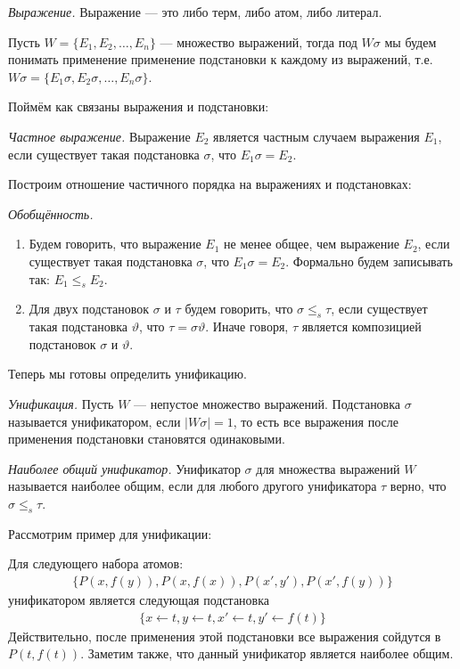\begin{definition}
  \emph{Выражение.} Выражение --- это либо терм, либо атом, либо литерал.
\end{definition}

Пусть $W = \{E_1, E_2, \ldots, E_n\}$ --- множество выражений, тогда под $W\sigma$ мы будем понимать применение применение подстановки к каждому из выражений, т.е. $W\sigma = \{E_1\sigma, E_2\sigma, \ldots, E_n\sigma\}$.

Поймём как связаны выражения и подстановки:
\begin{definition}
\emph{Частное выражение.} Выражение $E_2$ является частным случаем выражения $E_1$, если существует такая подстановка $\sigma$, что $E_1\sigma = E_2$.
\end{definition}

Построим отношение частичного порядка на выражениях и подстановках:
\begin{definition}
\emph{Обобщённость.}
  \begin{enumerate}
	\item Будем говорить, что выражение $E_1$ не менее общее, чем выражение $E_2$, если существует такая подстановка $\sigma$, что $E_1\sigma = E_2$. Формально будем записывать так: $E_1 \leq_s E_2$.
    \item Для двух подстановок $\sigma$ и $\tau$ будем говорить, что $\sigma \leq_s \tau$, если существует такая подстановка $\vartheta$, что $\tau = \sigma\vartheta$. Иначе говоря, $\tau$ является композицией подстановок $\sigma$ и $\vartheta$.
  \end{enumerate}
\end{definition}

Теперь мы готовы определить унификацию.

\begin{definition}
\emph{Унификация.} Пусть $W$ --- непустое множество выражений. Подстановка $\sigma$ называется унификатором, если $|W\sigma| = 1$, то есть все выражения после применения подстановки становятся одинаковыми.
\end{definition}

\begin{definition}
\emph{Наиболее общий унификатор.} Унификатор $\sigma$ для множества выражений $W$ называется наиболее общим, если для любого другого унификатора $\tau$ верно, что $\sigma \leq_s \tau$.
\end{definition}

Рассмотрим пример для унификации:
\begin{example}
Для следующего набора атомов:
\begin{gather*}
\{ P(x, f(y)), P(x, f(x)), P(x',y'), P(x', f(y)) \}
\end{gather*}
унификатором является следующая подстановка
\begin{gather*}
\{ x \leftarrow t, y \leftarrow t, x' \leftarrow t, y' \leftarrow f(t) \}
\end{gather*}
Действительно, после применения этой подстановки все выражения сойдутся в $P(t, f(t))$. Заметим также, что данный унификатор является наиболее общим.
\end{example}


